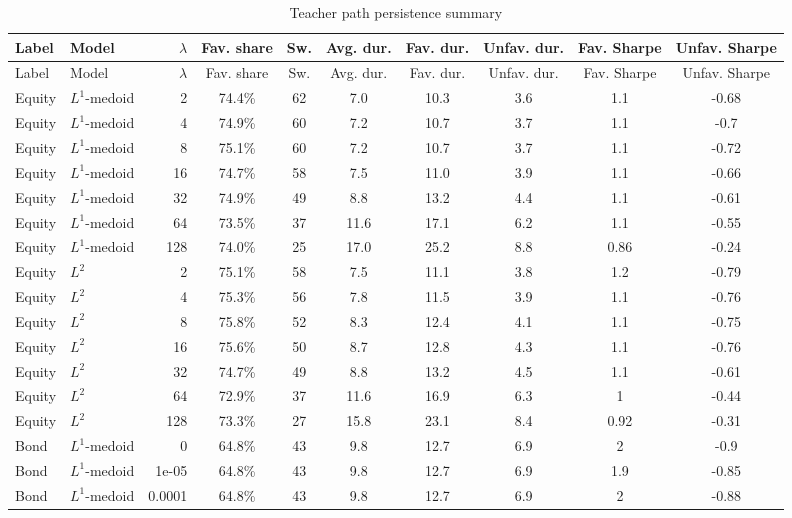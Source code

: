 \begin{landscape}
\begingroup
\scriptsize
\setlength{\LTcapwidth}{0.92\linewidth}
\setlength{\tabcolsep}{3.5pt}
\renewcommand{\arraystretch}{0.96}
\begin{longtable}{llrccccccc}
\caption{Teacher path persistence summary}\label{tab:app-teacher-path-persistence}\\
\toprule
Label & Model & $\lambda$ & Fav. share & Sw. & Avg. dur. & Fav. dur. & Unfav. dur. & Fav. Sharpe & Unfav. Sharpe \\
\midrule
\endfirsthead
\toprule
Label & Model & $\lambda$ & Fav. share & Sw. & Avg. dur. & Fav. dur. & Unfav. dur. & Fav. Sharpe & Unfav. Sharpe \\
\midrule
\endhead
Equity & $L^1$-medoid & 2 & 74.4\% & 62 & 7.0 & 10.3 & 3.6 & 1.1 & -0.68 \\
Equity & $L^1$-medoid & 4 & 74.9\% & 60 & 7.2 & 10.7 & 3.7 & 1.1 & -0.7 \\
Equity & $L^1$-medoid & 8 & 75.1\% & 60 & 7.2 & 10.7 & 3.7 & 1.1 & -0.72 \\
Equity & $L^1$-medoid & 16 & 74.7\% & 58 & 7.5 & 11.0 & 3.9 & 1.1 & -0.66 \\
Equity & $L^1$-medoid & 32 & 74.9\% & 49 & 8.8 & 13.2 & 4.4 & 1.1 & -0.61 \\
Equity & $L^1$-medoid & 64 & 73.5\% & 37 & 11.6 & 17.1 & 6.2 & 1.1 & -0.55 \\
Equity & $L^1$-medoid & 128 & 74.0\% & 25 & 17.0 & 25.2 & 8.8 & 0.86 & -0.24 \\
Equity & $L^2$ & 2 & 75.1\% & 58 & 7.5 & 11.1 & 3.8 & 1.2 & -0.79 \\
Equity & $L^2$ & 4 & 75.3\% & 56 & 7.8 & 11.5 & 3.9 & 1.1 & -0.76 \\
Equity & $L^2$ & 8 & 75.8\% & 52 & 8.3 & 12.4 & 4.1 & 1.1 & -0.75 \\
Equity & $L^2$ & 16 & 75.6\% & 50 & 8.7 & 12.8 & 4.3 & 1.1 & -0.76 \\
Equity & $L^2$ & 32 & 74.7\% & 49 & 8.8 & 13.2 & 4.5 & 1.1 & -0.61 \\
Equity & $L^2$ & 64 & 72.9\% & 37 & 11.6 & 16.9 & 6.3 & 1 & -0.44 \\
Equity & $L^2$ & 128 & 73.3\% & 27 & 15.8 & 23.1 & 8.4 & 0.92 & -0.31 \\
Bond & $L^1$-medoid & 0 & 64.8\% & 43 & 9.8 & 12.7 & 6.9 & 2 & -0.9 \\
Bond & $L^1$-medoid & 1e-05 & 64.8\% & 43 & 9.8 & 12.7 & 6.9 & 1.9 & -0.85 \\
Bond & $L^1$-medoid & 0.0001 & 64.8\% & 43 & 9.8 & 12.7 & 6.9 & 2 & -0.88 \\

\end{longtable}
\end{landscape}
